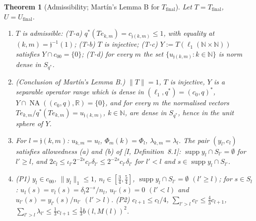 \documentclass[10pt]{amsart}
\newtheorem{theorem}{Theorem}[section]
\theoremstyle{definition}
\theoremstyle{remark}
\newcommand{\NA}{\operatorname{NA}}
\newcommand{\supp}{\operatorname{supp}}
\newcommand{\R}{\mathbb R}
\newcommand{\N}{\mathbb N}
\begin{document}
\begin{theorem}[Admissibility; Mart\'in's Lemma B for $T_{\mathrm{final}}$]
\label{thm:II-lemmaB}
Let $T=T_{\mathrm{final}}$, $U=U_{\mathrm{final}}$.
\begin{enumerate}
\item[(a)] $T$ is admissible: \textup{(T-a)} $q^*(Te_{k,m})=
c_{\mathfrak j(k,m)}\le1$, with equality at $(k,m)=\mathfrak j^{-1}(1)$;
\textup{(T-b)} $T$ is injective; \textup{(T-c)}
$Y:=T(\ell_1(\N\times\N))$ satisfies $Y\cap c_{00}=\{0\}$;
\textup{(T-d)} for every $m$ the set $\{u_{\mathfrak j(k,m)}:k\in\N\}$ is
norm dense in $S_{q^*}$.
\item[(b)] \textup{(Conclusion of Mart\'in's Lemma B.)}  $\|T\|=1$, $T$ is
injective, $Y$ is a separable operator range which is dense in
$(\ell_1,q^*)=(c_0,q)^*$, $Y\cap\NA((c_0,q),\R)=\{0\}$, and for every $m$
the normalised vectors $Te_{k,m}/q^*(Te_{k,m})=u_{\mathfrak j(k,m)}$,
$k\in\N$, are dense in $S_{q^*}$, hence in the unit sphere of $Y$.
\item[(c)] For $l=\mathfrak j(k,m)$: $u_{k,m}=u_l$, $\Phi_m(k)=\Phi_l$,
$\lambda_{k,m}=\lambda_l$.  The pair $(y_l,c_l)$ satisfies allowedness
(a) and (b) of [I, Definition~8.1]:
$\supp y_l\cap S_{l'}=\emptyset$ for $l'\ge l$, and
$2c_l\le\iota_{l'}2^{-2s}c_{l'}\delta_{l'}\le2^{-2s}c_{l'}\delta_{l'}$ for
$l'<l$ and $s\in\supp y_l\cap S_{l'}$.
\item[(d)] \textup{(P1)} $y_l\in c_{00}$, $\|y_l\|_1\le1$,
$n_l\in[\frac34,\frac54]$, $\supp y_l\cap S_{l'}=\emptyset$ $(l'\ge l)$;
for $s\in S_l$: $u_l(s)=v_l(s)=\delta_l2^{-s}/n_l$, $u_{l'}(s)=0$
$(l'<l)$ and $u_{l'}(s)=y_{l'}(s)/n_{l'}$ $(l'>l)$.
\textup{(P2)} $c_{l+1}\le c_l/4$, $\sum_{l'>l}c_{l'}\le\frac43c_{l+1}$,
$\sum_{l'>l}\lambda_{l'}\le\frac13c_{l+1}\le\frac13b(l,M(l))^2$.
\end{enumerate}
\end{theorem}
\end{document}

